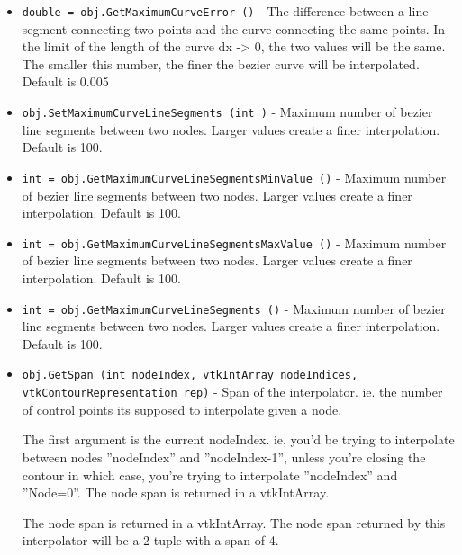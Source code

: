 \begin{itemize}
\item  \verb|double = obj.GetMaximumCurveError ()| -  The difference between a line segment connecting two points and the curve
 connecting the same points. In the limit of the length of the curve 
 dx -> 0, the two values will be the same. The smaller this number, the 
 finer the bezier curve will be interpolated. Default is 0.005

\item  \verb|obj.SetMaximumCurveLineSegments (int )| -  Maximum number of bezier line segments between two nodes. Larger values
 create a finer interpolation. Default is 100.

\item  \verb|int = obj.GetMaximumCurveLineSegmentsMinValue ()| -  Maximum number of bezier line segments between two nodes. Larger values
 create a finer interpolation. Default is 100.

\item  \verb|int = obj.GetMaximumCurveLineSegmentsMaxValue ()| -  Maximum number of bezier line segments between two nodes. Larger values
 create a finer interpolation. Default is 100.

\item  \verb|int = obj.GetMaximumCurveLineSegments ()| -  Maximum number of bezier line segments between two nodes. Larger values
 create a finer interpolation. Default is 100.

\item  \verb|obj.GetSpan (int nodeIndex, vtkIntArray nodeIndices, vtkContourRepresentation rep)| -  Span of the interpolator. ie. the number of control points its supposed
 to interpolate given a node. 

 The first argument is the current nodeIndex.
 ie, you'd be trying to interpolate between nodes ''nodeIndex'' and 
 ''nodeIndex-1'', unless you're closing the contour in which case, you're
 trying to interpolate ''nodeIndex'' and ''Node=0''. The node span is 
 returned in a vtkIntArray. 

 The node span is returned in a vtkIntArray. The node span returned by 
 this interpolator will be a 2-tuple with a span of 4.

\end{itemize}
